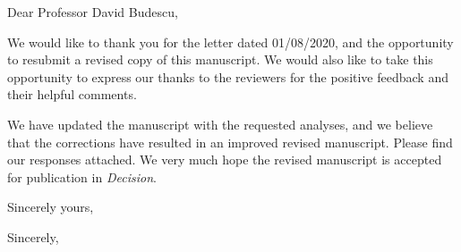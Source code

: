 \documentclass{letter}
\begin{document}
\begin{letter}
{}
\opening{Dear Professor David Budescu,}

We would like to thank you for the letter dated 01/08/2020, and the opportunity to resubmit a revised copy of this manuscript. We would also like to take this opportunity to express our thanks to the reviewers for the positive feedback and their helpful comments.


We have updated the manuscript with the requested analyses, and we believe that the corrections have resulted in an improved revised manuscript. Please find our responses attached. We very much hope the revised manuscript is accepted for publication in \textit{Decision}.


Sincerely yours,

\closing{Sincerely,}



\end{letter}
\end{document}
